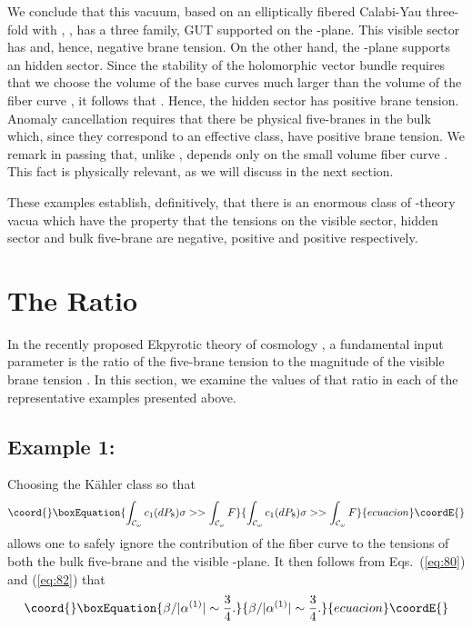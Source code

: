\documentclass[a4paper,12pt]{article}
\numberwithin{equation}{section}
\theoremstyle{plain}
\begin{document}
We conclude that this vacuum, based on an elliptically fibered Calabi-Yau
three-fold with \coordHE{}, \coordHE{}, has a three family, \coordHE{} GUT supported
on the \coordHE{}-plane. This visible sector has \coordHE{} and, hence,
negative brane tension. On the other hand, the \coordHE{}-plane supports an \coordHE{}
hidden sector. Since the stability of the holomorphic vector bundle
\coordHE{} requires that we choose the volume of the base curves much larger than
the volume of the fiber curve \coordHE{}, it follows that \coordHE{}. Hence,
the hidden sector has positive brane tension. Anomaly cancellation requires
that there be physical five-branes in the bulk which, since they correspond to
an effective class, have positive brane tension. We remark in passing that,
unlike \coordHE{}, \myHighlight{$\beta$}\coordHE{} depends only on the small volume fiber curve
\coordHE{}. This fact is physically relevant, as we will discuss in the next section.

These examples establish, definitively, that there is an enormous class of
\coordHE{}-theory vacua which have the property that the tensions on the visible
sector, hidden sector and bulk five-brane are negative, positive and positive
respectively.

\section{The Ratio \coordHE{}}

In the recently proposed Ekpyrotic theory of cosmology 
\cite{EU}, a fundamental input
parameter is the ratio of the five-brane tension \myHighlight{$\beta$}\coordHE{} to the magnitude of
the visible brane tension \coordHE{}. In this section, we examine the
values of that ratio in each of the representative examples presented above.

\subsection*{Example 1:}

Choosing the K\"{a}hler class so that 
%
\begin{equation}\coord{}\boxEquation{
\int_{{\cal{C}}_{\omega}}{c_{1}(dP_{8})\sigma} >>\int_{{\cal{C}}_{\omega}}{F}
\label{eq:125}
}{
\int_{{\cal{C}}_{\omega}}{c_{1}(dP_{8})\sigma} >>\int_{{\cal{C}}_{\omega}}{F}
}{ecuacion}\coordE{}\end{equation}
%
allows one to safely ignore the contribution of the fiber curve to the
tensions of both the bulk five-brane and the visible \coordHE{}-plane. It then
follows from Eqs.~(\ref{eq:80}) and (\ref{eq:82}) that
%
\begin{equation}\coord{}\boxEquation{
\beta/|\alpha^{(1)}|\sim \frac{3}{4}.
\label{eq:126}
}{
\beta/|\alpha^{(1)}|\sim \frac{3}{4}.
}{ecuacion}\coordE{}\end{equation}
%
\end{document}
